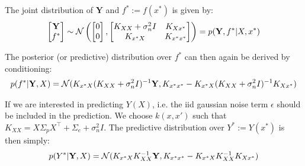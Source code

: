 The joint distribution of $\mathbf{Y}$ and $f^{\ast} := f(x^{\ast})$ is given by:
\begin{gather}
    \begin{bmatrix}
        \mathbf{Y} \\
        f^{\ast}
    \end{bmatrix}
    \sim \operatorname{\mathcal{N}} \left(
        \begin{bmatrix}
        0 \\
        0
        \end{bmatrix},
        \begin{bmatrix}
        K_{XX} + \sigma_n^2 I & K_{Xx^{\ast}} \\
        K_{x^{\ast}X} & K_{x^{\ast}x^{\ast}}
        \end{bmatrix}
        \right)
    = p(\mathbf{Y}, f^{\ast}| X, x^{\ast})
\end{gather}


The posterior (or predictive) distribution over $f^{\ast}$ can then again be derived by conditioning:
\begin{gather}\label{eq:posterior-gp}
    p(f^{\ast}| \mathbf{Y}, X) = \operatorname{\mathcal{N}}(
K_{x^{\ast}X} (K_{XX} + \sigma_n^2 I)^{-1} \mathbf{Y},
K_{x^{\ast}x^{\ast}} - K_{x^{\ast}X}(K_{XX} + \sigma_n^2 I)^{-1}K_{Xx^{\ast}})
\end{gather}

If we are interested in predicting $Y(X)$, i.e. the iid gaussian noise term $\epsilon$
should be included in the prediction. We choose $k(x,x')$ such that
$K_{XX} =  X \Sigma_p X^{\top} + \Sigma_e + \sigma_n^2 I$.
The predictive distribution over
$Y^{\ast} := Y(x^{\ast})$ is then simply:
\begin{gather}\label{eq:posterior-gp-noise}
    p(Y^{\ast}| \mathbf{Y}, X) = \operatorname{\mathcal{N}}(
K_{x^{\ast}X} K_{XX}^{-1} \mathbf{Y},
K_{x^{\ast}x^{\ast}} - K_{x^{\ast}X} K_{XX}^{-1} K_{Xx^{\ast}})
\end{gather}


%



